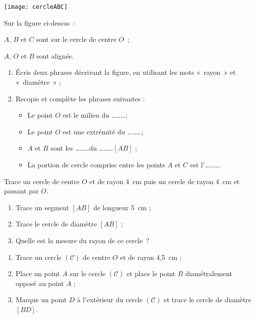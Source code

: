 

\begin{exercice}[Vocabulaire]
 \begin{center} \texttt{[image: cercleABC]} \end{center}
 Sur la figure ci-dessus : 
 
$A$, $B$ et $C$ sont sur le cercle de centre $O$ ;

$A$, $O$ et $B$ sont alignés.
 \begin{enumerate}
  \item Écris deux phrases décrivant la figure, en utilisant les mots « rayon » et « diamètre » ;
  \item Recopie et complète les phrases suivantes :
   \begin{itemize}
    \item Le point $O$ est le milieu du \ldots \ldots \ldots ;
    \item Le point $O$ est une extrémité du \ldots \ldots \ldots ;
    \item $A$ et $B$ sont les \ldots \ldots \ldots du \ldots \ldots \ldots $[AB]$ ;
    \item La portion de cercle comprise entre les points $A$ et $C$ est l'\ldots \ldots \ldots.
    \end{itemize}
  \end{enumerate}
\end{exercice}


\begin{exercice}
Trace un cercle de centre $O$ et de rayon 4 cm puis un cercle de rayon 4 cm et passant par $O$.
\end{exercice}


\begin{exercice}
 \begin{enumerate}
  \item Trace un segment $[AB]$ de longueur 5 cm ;
  \item Trace le cercle de diamètre $[AB]$ ;
  \item Quelle est la mesure du rayon de ce cercle ?
  \end{enumerate}
\end{exercice}


\begin{exercice}[Construction]
 \begin{enumerate}
  \item Trace un cercle $(\mathcal{C})$ de centre $O$ et de rayon 4,5 cm ;
  \item Place un point $A$ sur le cercle $(\mathcal{C})$ et place le point $B$ diamétralement opposé au point $A$ ;
  \item Marque un point $D$ à l'extérieur du cercle $(\mathcal{C})$ et trace le cercle de diamètre $[BD]$.
 \end{enumerate}
\end{exercice}



